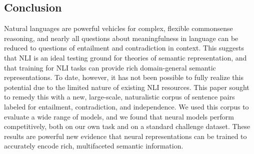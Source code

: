 \subsection{Conclusion}\label{sec:conclusion}

Natural languages are powerful vehicles for complex, flexible
commonsense reasoning, and nearly all questions about meaningfulness
in language can be reduced to questions of entailment
and contradiction in context. This suggests that NLI is an ideal testing ground
for theories of semantic representation, and that training for NLI
tasks can provide rich domain-general semantic representations.  To
date, however, it has not been possible to fully realize this
potential due to the limited nature of existing NLI resources.  This
paper sought to remedy this with a new, large-scale, naturalistic
corpus of sentence pairs labeled for entailment, contradiction, and
independence. We used this corpus to evaluate a wide range of models,
and we found that neural models perform competitively, both on our own
task and on a standard challenge dataset.
These results are powerful new evidence that neural representations
can be trained to accurately encode rich, multifaceted semantic
information.
